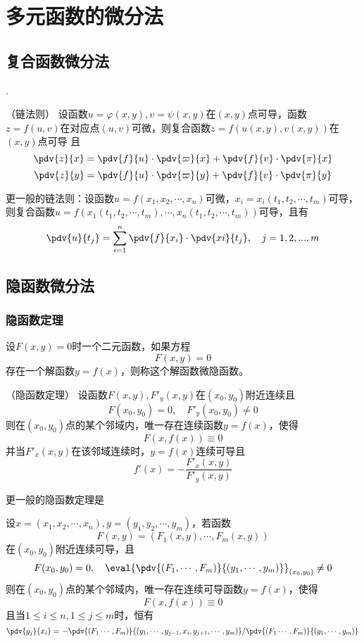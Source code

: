 \section{多元函数的微分法}
\subsection{复合函数微分法}
.
\begin{theorem}
    （链法则）
    \label{th:链法则}
    设函数$u=\varphi(x,y),v=\psi(x,y)$在$(x,y)$点可导，函数$z=f(u,v)$在对应点$(u,v)$可微，则复合函数$z=f(u(x,y),v(x,y))$在$(x,y)$点可导
    且
    \[
        \pdv{z}{x} = \pdv{f}{u}\cdot\pdv{\varpi}{x} + \pdv{f}{v}\cdot\pdv{\pi}{x}
    \]
    \[
        \pdv{z}{y} = \pdv{f}{u}\cdot\pdv{\varpi}{y} + \pdv{f}{v}\cdot\pdv{\pi}{y}
    \]
\end{theorem}

\begin{theorem}
    更一般的链法则：设函数$u=f(x_1,x_2,\cdots,x_n)$可微，$x_i=x_i(t_1,t_2,\cdots,t_m)$可导，则复合函数$u=f(x_1(t_1,t_2,\cdots,t_m),\cdots,x_n(t_1,t_2,\cdots,t_m))$可导，且有
    \[
        \pdv{u}{t_j} = \sum_{i=1}^n \pdv{f}{x_i}\cdot\pdv{xi}{t_j}, \quad j = 1,2,...,m
    \]
\end{theorem}

\subsection{隐函数微分法}
\subsubsection{隐函数定理}
设$F(x,y)=0$时一个二元函数，如果方程
\[ F(x,y) = 0 \]
存在一个解函数$y=f(x)$，则称这个解函数微隐函数。
\begin{theorem}
    （隐函数定理）
    \label{th:隐函数定理}
    设函数$F(x,y),F'_y(x,y)$在$(x_0,y_0)$附近连续且
    \[ F(x_0,y_0) = 0, \quad F'_y(x_0,y_0)\neq 0 \]
    则在$(x_0,y_0)$点的某个邻域内，唯一存在连续函数$y=f(x)$，使得
    \[ F(x,f(x)) \equiv 0 \]
    并当$F'_x(x,y)$在该邻域连续时，$y=f(x)$连续可导且
    \[ f'(x) = - \frac{F'_x(x,y)}{F'_y(x,y)} \]
\end{theorem}

更一般的隐函数定理是
\begin{theorem}
    设$x=(x_1,x_2,\cdots,x_n),y=(y_1,y_2,\cdots,y_m)$，若函数
    \[ F(x,y) = (F_1(x,y),\cdots,F_m(x,y)) \]
    在$(x_0,y_0)$附近连续可导，且
    \[ F(x_0,y_0) = 0, \quad\eval{\pdv{(F_1,\cdots,F_m)}{(y_1,\cdots,y_m)}}_{(x_0,y_0)} \neq 0 \]
    则在$(x_0,y_0)$点的某个邻域内，唯一存在连续可导函数$y=f(x)$，使得
    \[ F(x,f(x))\equiv 0 \]
    且当$1\leq i \leq n, 1\leq j\leq m$时，恒有
    \[
        \pdv{y_j}{x_i}
        =
        \left.
        - \pdv{(F_1\cdots,F_m)}{(y_1,\cdots,y_{j-1},x_i,y_{j+1},\cdots,y_m)}
        \middle/
        \pdv{(F_1\cdots,F_m)}{(y_1,\cdots,y_m)}
        \right.
    \]
\end{theorem}

